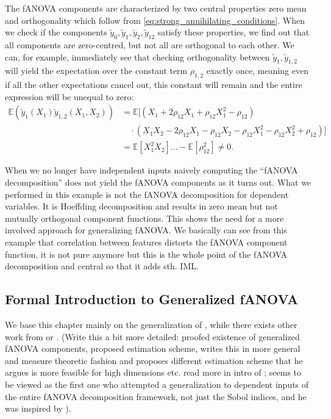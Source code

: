 The fANOVA components are characterized by two central properties zero mean and orthogonality which follow from \autoref{eq:strong_annihilating_conditions}.
When we check if the components $\tilde{y}_0, \tilde{y}_1, \tilde{y}_2, \tilde{y}_{12}$ satisfy these properties, we find out that all components are zero-centred, but not all are orthogonal to each other. We can, for example, immediately see that checking orthogonality between $\tilde{y}_{1}, \tilde{y}_{1,2}$ will yield the expectation over the constant term $\rho_{1,2}$ exactly once, meaning even if all the other expectations cancel out, this constant will remain and the entire expression will be unequal to zero:
\begin{align*}
    \mathbb{E}(\tilde{y}_1(X_1)\tilde{y}_{1,2}(X_1, X_2)) 
    &= \mathbb{E}[(X_1 + 2\rho_{12}X_1 + \rho_{12}X_1^2 - \rho_{12}) \\
    &\quad \cdot (X_1 X_2 - 2\rho_{12} X_1 - \rho_{12} X_2 - \rho_{12} X_1^2 - \rho_{12} X_2^2 + \rho_{12})] \\
    &= \mathbb{E}[X_{1}^2X_2] \ldots - \mathbb{E}[\rho_{12}^2] \neq 0.
\end{align*}

When we no longer have independent inputs naively computing the ``fANOVA decomposition'' does not yield the fANOVA components as it turns out. What we performed in this example is not the fANOVA decomposition for dependent variables. It is Hoeffding decomposition \citep{hoeffding1948} and results in zero mean but not mutually orthogonal component functions. This shows the need for a more involved approach for generalizing fANOVA.
We basically can see from this example that correlation between features distorts the fANOVA component function, it is not pure anymore but this is the whole point of the fANOVA decomposition and central so that it adds sth. IML.

\subsection{Formal Introduction to Generalized fANOVA}
We base this chapter mainly on the generalization of \cite{rahman2014}, while there exists other work from \cite{hooker2007} or \cite{chastaing2012}. (Write this a bit more detailed: \cite{hooker2007} proofed existence of generalized fANOVA components, proposed estimation scheme, \cite{rahman2014} writes this in more general and measure theoretic fashion and proposes different estimation scheme that he argues is more feasible for high dimensions etc. read more in intro of \cite{rahman2014}; \cite{hooker2007} seems to be viewed as the first one who attempted a generalization to dependent inputs of the entire fANOVA decomposition framework, not just the Sobol indices, and he was inspired by \cite{stone1994}).\par

